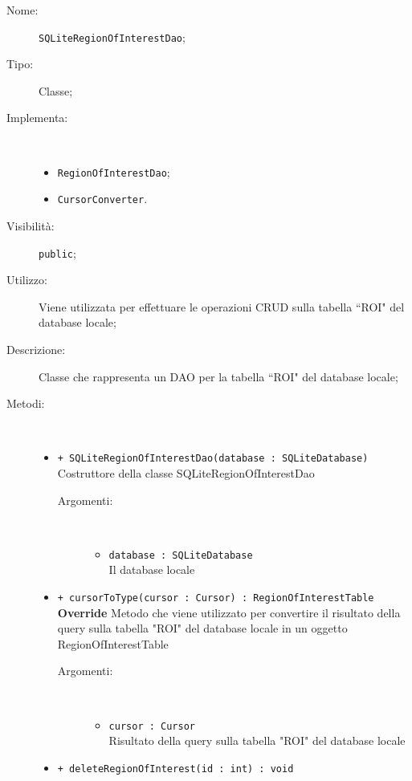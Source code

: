 \documentclass[../DefinizioneDiProdotto.tex]{subfiles}
\begin{document}
\begin{description}
	\item[Nome:] \texttt{SQLiteRegionOfInterestDao};
	\item[Tipo:] Classe;
	\item[Implementa:] \
	\begin{itemize}
		\item \texttt{RegionOfInterestDao};
		
		\item \texttt{CursorConverter}.
		
	\end{itemize}
	\item[Visibilità:] \texttt{public};
	\item[Utilizzo:] Viene utilizzata per effettuare le operazioni CRUD sulla tabella “ROI" del database locale;
	\item[Descrizione:] Classe che rappresenta un DAO per la tabella “ROI" del database locale;
	\item[Metodi:] \
	\begin{itemize}
		\item \texttt{+ SQLiteRegionOfInterestDao(database : SQLiteDatabase)}\\
		Costruttore della classe SQLiteRegionOfInterestDao
		\begin{description}
			\item[Argomenti:] \
			\begin{itemize}
				\item \texttt{database : SQLiteDatabase}\\
				Il database locale\end{itemize}
		\end{description}
		\item \texttt{+ cursorToType(cursor : Cursor) : RegionOfInterestTable}\\
		\textbf{Override} Metodo che viene utilizzato per convertire il risultato della query sulla tabella "ROI" del database locale in un oggetto RegionOfInterestTable
		\begin{description}
			\item[Argomenti:] \
			\begin{itemize}
				\item \texttt{cursor : Cursor}\\
				Risultato della query sulla tabella "ROI" del database locale\end{itemize}
		\end{description}
		\item \texttt{+ deleteRegionOfInterest(id : int) : void}\\

\end{itemize}
\end{description}
\end{document}
